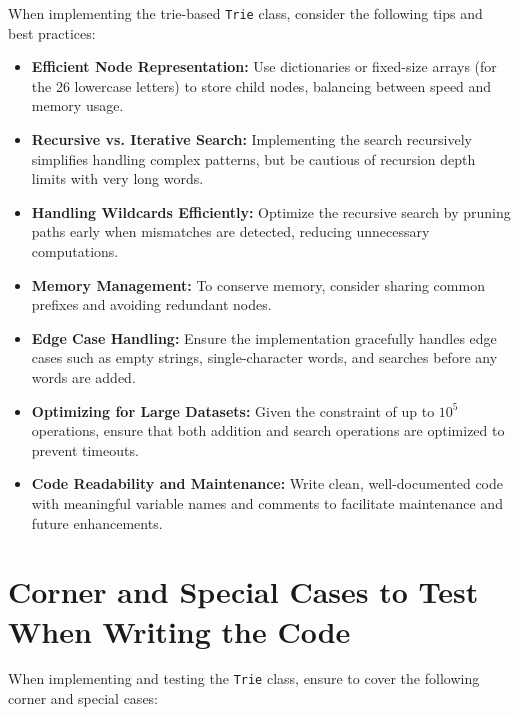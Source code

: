 When implementing the trie-based \texttt{Trie} class, consider the following tips and best practices:

\begin{itemize}
    \item \textbf{Efficient Node Representation:}  
    Use dictionaries or fixed-size arrays (for the 26 lowercase letters) to store child nodes, balancing between speed and memory usage.
    
    \item \textbf{Recursive vs. Iterative Search:}  
    Implementing the search recursively simplifies handling complex patterns, but be cautious of recursion depth limits with very long words.
    
    \item \textbf{Handling Wildcards Efficiently:}  
    Optimize the recursive search by pruning paths early when mismatches are detected, reducing unnecessary computations.
    
    \item \textbf{Memory Management:}  
    To conserve memory, consider sharing common prefixes and avoiding redundant nodes.
    
    \item \textbf{Edge Case Handling:}  
    Ensure the implementation gracefully handles edge cases such as empty strings, single-character words, and searches before any words are added.
    
    \item \textbf{Optimizing for Large Datasets:}  
    Given the constraint of up to \(10^5\) operations, ensure that both addition and search operations are optimized to prevent timeouts.
    
    \item \textbf{Code Readability and Maintenance:}  
    Write clean, well-documented code with meaningful variable names and comments to facilitate maintenance and future enhancements.
\end{itemize}

\section*{Corner and Special Cases to Test When Writing the Code}

When implementing and testing the \texttt{Trie} class, ensure to cover the following corner and special cases:

